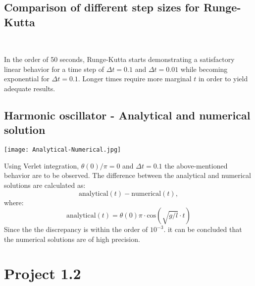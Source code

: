 \documentclass[12pt]{article}
\begin{document}
\newpage
\subsection*{Comparison of different step sizes for Runge-Kutta}
\begin{figure*}[ht!]
\begin{center}
   \\
   \caption{\label{workflow}
   (a) $ \Delta t = 0.1$; 
   (b) $ \Delta t = 0.01$; 
   (c) $\Delta t = 0.001$}
\end{center}
\end{figure*}
\noindent In the order of 50 seconds, Runge-Kutta starts demonstrating a satisfactory linear behavior for a time step of $\Delta t = 0.1$ and $\Delta t = 0.01$ while becoming exponential for $\Delta t = 0.1$. Longer times require more marginal $t$ in order to yield adequate results.
\subsection*{Harmonic oscillator - Analytical and numerical solution}
\begin{figure*}[ht!]
\begin{center}
    \texttt{[image: Analytical-Numerical.jpg]}
 \caption{}
\end{center}
\end{figure*}
\noindent Using Verlet integration, 
$\theta(0)/\pi = 0$ and $\Delta t = 0.1$ the above-mentioned behavior are to be observed.
The difference between the analytical and numerical solutions are calculated as: 
\begin{equation*}
\text{analytical}(t) - \text{numerical}(t),
\end{equation*}
where:
\begin{equation*}
\text{analytical}(t) 
= \theta(0)\pi\cdot\text{cos}(\sqrt{g/l}\cdot t) 
\end{equation*}
Since the the discrepancy is within the order of $10^{-3}$. it can be concluded that the numerical solutions are of high precision.


\newpage
\section*{Project 1.2}
\end{document}
